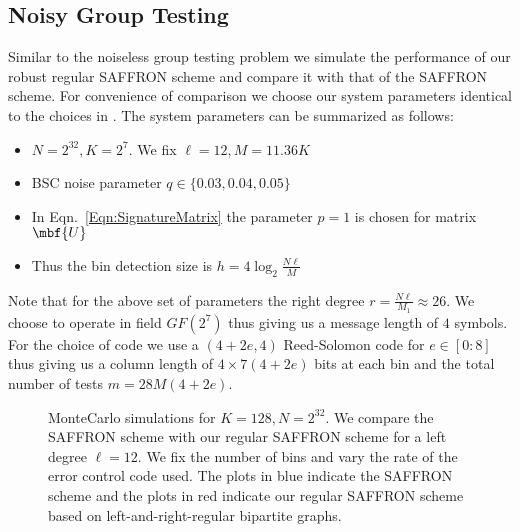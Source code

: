 \documentclass[conference,twocolumn]{IEEEtran}
\newcommand*{\MyPath}{../bib}
\newcommand*{\FigPath}{./Figures}
\begin{document}
\subsection*{Noisy Group Testing}
Similar to the noiseless group testing problem we simulate the performance of our robust regular SAFFRON scheme and compare it with that of the SAFFRON scheme. For convenience of comparison we choose our system parameters identical to the choices in \cite{lee2015saffron}. The system parameters can be summarized as follows:
\begin{itemize}
\item $N=2^{32}, K=2^7$. We fix $\ell=12, M=11.36K$ 
\item BSC noise parameter $q\in\{0.03,0.04,0.05\}$
\item In Eqn.~\ref{Eqn:SignatureMatrix} the parameter $p=1$ is chosen for matrix $\mbf{U}$
\item Thus the bin detection size is $h=4\log_2 \frac{N\ell}{M}$
\end{itemize}
Note that for the above set of parameters the right degree $r=\frac{N\ell}{M_1}\approx 26$. We choose to operate in field $GF(2^7)$ thus giving us a message length of $4$ symbols. For the choice of code we use a $(4+2e,4)$ Reed-Solomon code for $e\in[0:8]$ thus giving us a column length of $4\times 7(4+2e)$ bits at each bin and the total number of tests $m=28M(4+2e)$.

\begin{figure}[t!]
\centering

\caption{MonteCarlo simulations for $K=128, N=2^{32}$. We compare the SAFFRON scheme with our regular SAFFRON scheme for a left degree $\ell=12$. We fix the number of bins and vary the rate of the error control code used. The plots in blue indicate the SAFFRON scheme\cite{lee2015saffron} and the plots in red indicate our regular SAFFRON scheme based on left-and-right-regular bipartite graphs.}
\label{Fig:SimulationNoisy}
\end{figure}




\end{document}

